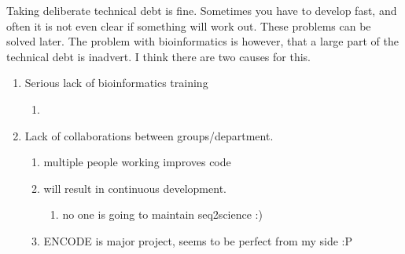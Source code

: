 Taking deliberate technical debt is fine. Sometimes you have to develop fast, and often it is not even clear if something will work out. These problems can be solved later. The problem with bioinformatics is however, that a large part of the technical debt is inadvert. I think there are two causes for this.
\begin{enumerate}
    \item Serious lack of bioinformatics training\cite{Williams2019}
    \begin{enumerate}
        \item 
    \end{enumerate}
    \item Lack of collaborations between groups/department. 
    \begin{enumerate}
        \item multiple people working improves code
        \item will result in continuous development.
        \begin{enumerate}
            \item no one is going to maintain seq2science :)
        \end{enumerate}
        \item ENCODE is major project, seems to be perfect from my side :P 
    \end{enumerate}
\end{enumerate}





